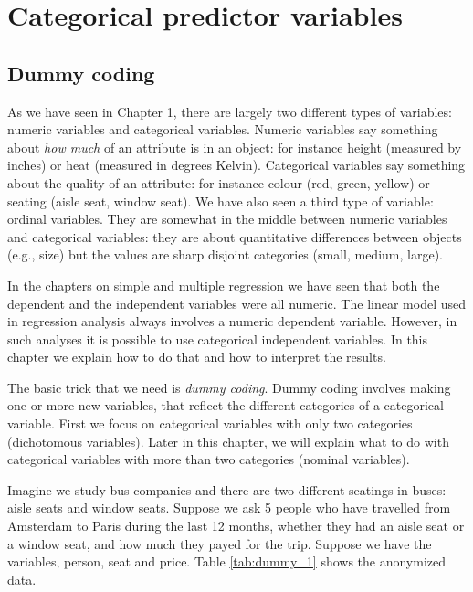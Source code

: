\chapter{Categorical predictor variables}\label{chap:categorical}



\section{Dummy coding}
As we have seen in Chapter 1, there are largely two different types of variables: numeric variables and categorical variables. Numeric variables say something about \textit{how much} of an attribute is in an object: for instance height (measured by inches) or heat (measured in degrees Kelvin). Categorical variables say something about the quality of an attribute: for instance colour (red, green, yellow) or seating (aisle seat, window seat). We have also seen a third type of variable: ordinal variables. They are somewhat in the middle between numeric variables and categorical variables: they are about quantitative differences between objects (e.g., size) but the values are sharp disjoint categories (small, medium, large).

In the chapters on simple and multiple regression we have seen that both the dependent and the independent variables were all numeric. The linear model used in regression analysis always involves a numeric dependent variable. However, in such analyses it is possible to use categorical independent variables. In this chapter we explain how to do that and how to interpret the results. 

The basic trick that we need is \textit{dummy coding}. Dummy coding involves making one or more new variables, that reflect the different categories of a categorical variable. First we focus on categorical variables with only two categories (dichotomous variables). Later in this chapter, we will explain what to do with categorical variables with more than two categories (nominal variables). 

Imagine we study bus companies and there are two different seatings in buses: aisle seats and window seats. Suppose we ask 5 people who have travelled from Amsterdam to Paris during the last 12 months, whether they had an aisle seat or a window seat, and how much they payed for the trip. Suppose we have the variables, person, seat and price. Table \ref{tab:dummy_1} shows the anonymized data.

\begin{kframe}


{\ttfamily\noindent\bfseries{}}

{\ttfamily\noindent\bfseries\color{errorcolor}{\#\# Error in data.frame(person, seat, price): object 'price' not found}}

{\ttfamily\noindent\bfseries{}}\end{kframe}


